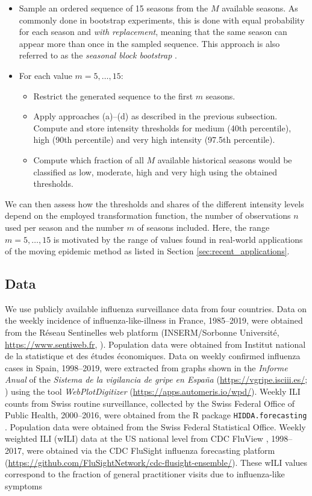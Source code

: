 \documentclass{article}
\begin{document}
\begin{itemize}
\item Sample an ordered sequence of 15 seasons from the $M$ available seasons. As commonly done in bootstrap experiments, this is done with equal probability for each season and \textit{with replacement}, meaning that the same season can appear more than once in the sampled sequence. This approach is also referred to as the \textit{seasonal block bootstrap} \citep{Politis2001}.
\item For each value $m = 5, \dots, 15$:
\begin{itemize}
\item Restrict the generated sequence to the first $m$ seasons.
\item Apply approaches (a)--(d) as described in the previous subsection. Compute and store intensity thresholds for medium (40th percentile), high (90th percentile) and very high intensity (97.5th percentile).
\item Compute which fraction of all $M$ available historical seasons would be classified as low, moderate, high and very high using the obtained thresholds.
\end{itemize}
\end{itemize}
We can then assess how the thresholds and shares of the different intensity levels depend on the employed transformation function, the number of observations $n$ used per season and the number $m$ of seasons included. Here, the range $m =5, \dots, 15$ is motivated by the range of values found in real-world applications of the moving epidemic method as listed in Section \ref{sec:recent_applications}.

\subsection{Data}

We use publicly available influenza surveillance data from four countries. Data on the weekly incidence of influenza-like-illness in France, 1985--2019, were obtained from the Réseau Sentinelles web platform (INSERM/Sorbonne Université, \url{https://www.sentiweb.fr}, \citealt{Flahault2006}). Population data were obtained from Institut national de la statistique et des études économiques. Data on weekly confirmed influenza cases in Spain, 1998--2019, were extracted from graphs shown in the \textit{Informe Anual} of the \textit{Sistema de la vigilancia de gripe en Espa\~na} (\url{https://vgripe.isciii.es/}; \citealt{SVGE2019}) using the tool \textit{WebPlotDigitizer} (\url{https://apps.automeris.io/wpd/}). Weekly ILI counts from Swiss routine surveillance, collected by the Swiss Federal Office of Public Health, 2000--2016, were obtained from the R package \texttt{HIDDA.forecasting} \citep{Held2019}. Population data were obtained from the Swiss Federal Statistical Office. Weekly weighted ILI (wILI) data at the US national level from CDC FluView \citep{Charbonneau2019}, 1998--2017, were obtained via the CDC FluSight influenza forecasting platform (\url{https://github.com/FluSightNetwork/cdc-flusight-ensemble/}). These wILI values correspond to the fraction of general practitioner visits due to influenza-like symptoms
\end{document}
